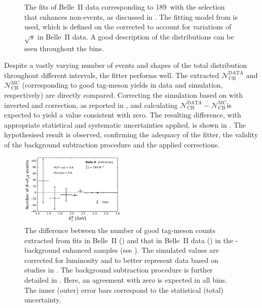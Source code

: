 \begin{figure}[hbtp!]
{    }
    \caption{\label{fig:mbc_bbar_ehnhanced_fits_data}
    The fits of Belle~II data corresponding to 189~\invfb with the selection 
    that enhances non-\BtoXsgamma events, as discussed in .
    The fitting model from  is used,
    which is defined on the corrected \Mbc to account for variations of $\sqrt{s}$ in Belle~II data.
    A good description of the \Mbc distributions can be seen throughout the \EB bins.
    }
\end{figure}

Despite a vastly varying number of events and shapes of the total distribution throughout different \EB intervals,
the fitter performs well.
The extracted $\mathcal{N}_{\mathrm{CB}}^{\mathrm{DATA}}$ and $\mathcal{N}_{\mathrm{CB}}^{\mathrm{MC}}$ (corresponding to good tag-\B meson yields in data and simulation, respectively)
are directly compared.
Correcting the simulation based on  with inverted \piVeto and \etaVeto correction, as reported in , and calculating $\mathcal{N}_{\mathrm{CB}}^{\mathrm{DATA}} - \mathcal{N}_{\mathrm{CB}}^{\mathrm{MC}}$is expected to yield a value consistent with zero.
The resulting difference, with appropriate statistical and systematic uncertainties applied, is shown in .
The hypothesised result is observed, confirming the adequacy of the fitter, the validity of the background subtraction procedure and the applied corrections.

\begin{figure}[hbtp!]
    \centering
    \includegraphics[width=0.45\textwidth]{figures/data_validation/bbar_enhanced_event_counts.pdf}
    \caption{\label{fig:bbar_enhanced_background_subtraction}
    The difference between the number of good tag-\B meson counts extracted from fits in Belle~II \MC () and that in Belle~II data () in the \BB-background enhanced samples (see ).
    The simulated values are corrected for luminosity and to better represent data based on studies in .
    The background subtraction procedure is further detailed in .
    Here, an agreement with zero is expected in all \EB bins.
    The inner (outer) error bars correspond to the statistical (total) uncertainty.
    }
\end{figure}

